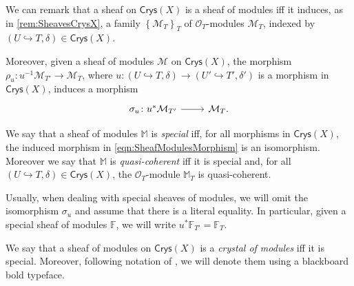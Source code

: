 \begin{rem}[]
	We can remark that a sheaf on $\mathsf{Crys}(X)$ is a sheaf of modules
	iff it induces, as in \cref{rem:SheavesCrysX}, a
	family $\left\{ \mathcal{M}_T \right\}_{T}$ of $\mathcal{O}_{ T }$-modules $\mathcal{M}_T$, 
	indexed by $\left(U \hookrightarrow T, \delta\right) \in \mathsf{Crys}(X)$.

	Moreover, given a sheaf of modules $\mathcal{M}$ on $\mathsf{Crys}(X)$,
	the morphism $\rho_u\colon u^{-1}\mathcal{M}_{T'} \to \mathcal{M}_T$,
	where $u\colon \left(U \hookrightarrow T, \delta\right) \to
	\left(U' \hookrightarrow T', \delta'\right)$
	is a morphism in $\mathsf{Crys}(X)$, induces a morphism
	\begin{equation}\label{eqn:SheafModulesMorphism}
	\begin{tikzcd}[row sep = 0ex
		,/tikz/column 1/.append style={anchor=base east}
		,/tikz/column 2/.append style={anchor=base west}]
		\sigma_u\colon 
		u^* \mathcal{M}_{T'}\arrow[r, "", rightarrow] &
		\mathcal{M}_T
	.\end{tikzcd}
	\end{equation} 	
\end{rem}


\begin{defn}[]\label{defn:SpecialQCSheavesCrys}
	We say that a sheaf of modules $\mathbb{M}$ is \emph{special}
	iff, for all morphisms in $\mathsf{Crys}(X)$,
	the induced morphism in \cref{eqn:SheafModulesMorphism}
	is an isomorphism.
	Moreover we say that $\mathbb{M}$ is \emph{quasi-coherent} iff it is special and, for all
	$\left(U \hookrightarrow T, \delta\right) \in \mathsf{Crys}(X)$, the $\mathcal{O}_{ T }$-module
	$\mathbb{M}_T$ is quasi-coherent.
\end{defn}


\begin{rem}[]\label{rem:specialSheavesIso}
	Usually, when dealing with special sheaves of modules, we will omit the isomorphism
	$\sigma_u$ and assume that there is a literal equality.
	In particular, given a special sheaf of modules \(\mathbb{F}\), we will write
	$u^*\mathbb{F}_{T'} = \mathbb{F}_T$.
\end{rem}


\begin{defn}
	We say that a sheaf of modules on $\mathsf{Crys}(X)$ is 
	a \emph{crystal of modules} iff it is special.
	Moreover, following notation of \cite{Messing}, we will
	denote them using a blackboard bold typeface.
\end{defn}


